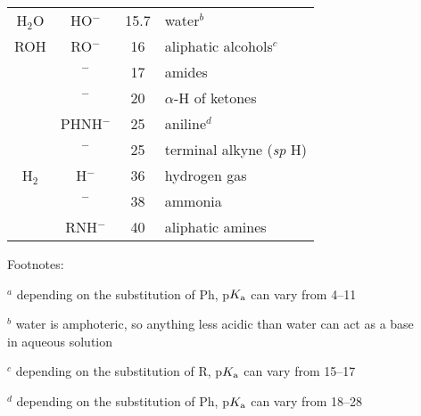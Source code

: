 \documentclass[10pt]{article}
\begin{document}
\begin{center}
\begin{tabular}{ccSl}
               H$_2$O         &   HO$^{-}$         &   15.7                      &   water$^{\textit{b}}$ \\
               ROH            &   RO$^{-}$         &   16                        &   aliphatic alcohols$^{\textit{c}}$ \\
                 &   $^{-}$ & 17                        &   amides \\
                 &   $^{-}$ & 20                       &   $\alpha$-H of ketones\\
                    &   PHNH$^{-}$       &   25                        &   aniline$^{\textit{d}}$ \\
                    &   $^{-}$  &   25                        &   terminal alkyne (\textit{sp} H) \\
               H$_2$          &   H$^{-}$          &   36                        &   hydrogen gas \\
                      &   $^{-}$   &   38                        &   ammonia \\
                     &   RNH$^{-}$        &   40                        &   aliphatic amines \\
               \bottomrule
          \end{tabular}
\end{center}

\bigskip Footnotes:

$^{\textit{a}}$ depending on the substitution of Ph, p$K_\textnormal{a}$ can vary from 4--11

$^{\textit{b}}$ water is amphoteric, so anything less acidic than water can act as a base \\ \hspace*{1.4mm} in aqueous solution

$^{\textit{c}}$ depending on the substitution of R, p$K_\textnormal{a}$ can vary from 15--17

$^{\textit{d}}$ depending on the substitution of Ph, p$K_\textnormal{a}$ can vary from 18--28

\bigskip{}

\end{document}

